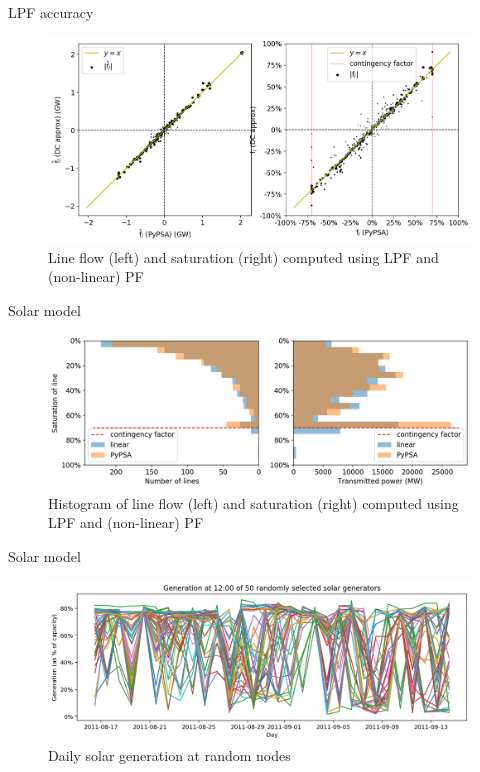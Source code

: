 \documentclass[10pt]{beamer}
\begin{document}
\begin{frame}{LPF accuracy}
    \begin{figure}
        \centering
        \includegraphics[width=\textwidth]{img/lineflowcorr.png}
        \caption{Line flow (left) and saturation (right) computed using LPF and (non-linear) PF}
    \end{figure}
\end{frame}
\begin{frame}{Solar model}
    \begin{figure}
        \centering
        \includegraphics[width=\textwidth]{img/saturationhistrot.png}
        \caption{Histogram of line flow (left) and saturation (right) computed using LPF and (non-linear) PF}
    \end{figure}
\end{frame}

\begin{frame}{Solar model}
    \begin{figure}
        \centering
        \includegraphics[width=\textwidth]{img/genprofilerandom.png}
        \caption{Daily solar generation at random nodes}
        \label{fig:genprofilerandom}
    \end{figure}
\end{frame}
\end{document}
